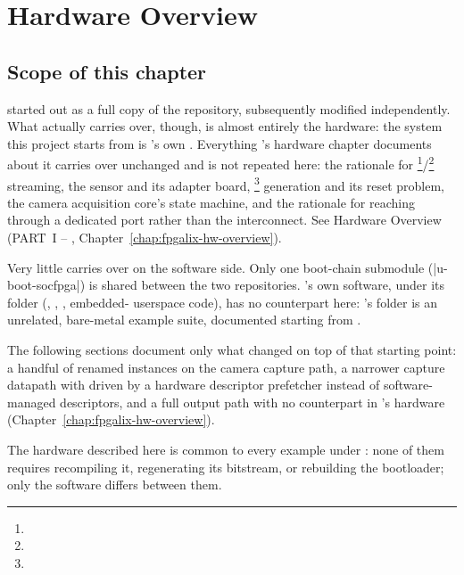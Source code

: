 \chapter{Hardware Overview}
\label{chap:fpgasteel-hw-overview}

\section{Scope of this chapter}
\label{sec:fpgasteel-hw-scope}

 started out as a full copy of the  repository, subsequently modified independently. What actually carries over, though, is almost entirely the hardware: the  system this project starts from is 's own . Everything 's hardware chapter documents about it carries over unchanged and is not repeated here: the rationale for \footnote{}/\footnote{} streaming, the  sensor and its adapter board, \footnote{} generation and its reset problem, the camera acquisition core's state machine, and the rationale for reaching  through a dedicated  port rather than the  interconnect. See Hardware Overview (PART~I -- , Chapter~\ref{chap:fpgalix-hw-overview}).

Very little carries over on the software side. Only one boot-chain submodule (|u-boot-socfpga|) is shared between the two repositories. 's own software, under its  folder (, , , embedded- userspace code), has no counterpart here: 's  folder is an unrelated, bare-metal example suite, documented starting from .

The following sections document only what changed on top of that starting point: a handful of renamed instances on the camera capture path, a narrower capture datapath with  driven by a hardware descriptor prefetcher instead of software-managed descriptors, and a full  output path with no counterpart in 's hardware (Chapter~\ref{chap:fpgalix-hw-overview}).

The hardware described here is common to every example under : none of them requires recompiling it, regenerating its bitstream, or rebuilding the bootloader; only the software differs between them.

